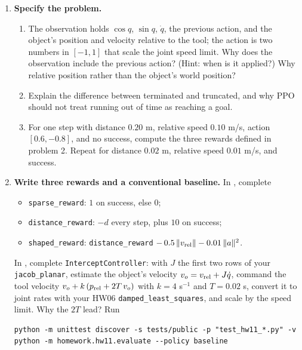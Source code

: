 \begin{enumerate}
\item \textbf{Specify the problem.}
\begin{enumerate}
\item The observation holds $\cos q$, $\sin q$, $\dot q$, the previous action,
and the object's position and velocity relative to the tool; the action is
two numbers in $[-1,1]$ that scale the joint speed limit. Why does the
observation include the previous action? (Hint: when is it applied?) Why
relative position rather than the object's world position?
\item Explain the difference between terminated and truncated, and why PPO
should not treat running out of time as reaching a goal.
\item For one step with distance $0.20$ m, relative speed $0.10$ m/s,
action $[0.6,-0.8]$, and no success, compute the three rewards defined in
problem 2. Repeat for distance $0.02$ m, relative speed $0.01$ m/s, and
success.
\end{enumerate}

\item \textbf{Write three rewards and a conventional baseline.}
In , complete
\begin{itemize}
\item \texttt{sparse\_reward}: $1$ on success, else $0$;
\item \texttt{distance\_reward}: $-d$ every step, plus $10$ on success;
\item \texttt{shaped\_reward}: \texttt{distance\_reward}
$-\,0.5\,\|v_{\rm rel}\|-0.01\,\|a\|^2$.
\end{itemize}
In , complete \texttt{InterceptController}:
with $J$ the first two rows of your \texttt{jacob\_planar}, estimate the
object's velocity $v_o=v_{\rm rel}+J\dot q$, command the tool velocity
$v_o+k\,(p_{\rm rel}+2T\,v_o)$ with $k=4$ s$^{-1}$ and $T=0.02$ s, convert
it to joint rates with your HW06 \texttt{damped\_least\_squares}, and scale
by the speed limit. Why the $2T$ lead? Run
\begin{lstlisting}
python -m unittest discover -s tests/public -p "test_hw11_*.py" -v
python -m homework.hw11.evaluate --policy baseline
\end{lstlisting}
\end{enumerate}

